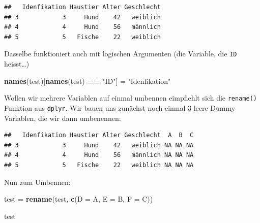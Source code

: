 \documentclass[
]{book}
\newenvironment{Shaded}{\begin{snugshade}}{\end{snugshade}}
\newcommand{\AttributeTok}[1]{\textcolor[rgb]{0.13,0.29,0.53}{#1}}
\newcommand{\ConstantTok}[1]{\textcolor[rgb]{0.56,0.35,0.01}{#1}}
\newcommand{\FunctionTok}[1]{\textcolor[rgb]{0.13,0.29,0.53}{\textbf{#1}}}
\newcommand{\NormalTok}[1]{#1}
\newcommand{\OtherTok}[1]{\textcolor[rgb]{0.56,0.35,0.01}{#1}}
\newcommand{\SpecialCharTok}[1]{\textcolor[rgb]{0.81,0.36,0.00}{\textbf{#1}}}
\newcommand{\StringTok}[1]{\textcolor[rgb]{0.31,0.60,0.02}{#1}}
\begin{document}
\begin{verbatim}
##   Idenfikation Haustier Alter Geschlecht
## 3            3     Hund    42   weiblich
## 4            4     Hund    56   männlich
## 5            5   Fische    22   weiblich
\end{verbatim}

Dasselbe funktioniert auch mit logischen Argumenten (die Variable, die \texttt{ID} heisst\ldots)

\begin{Shaded}
\begin{Highlighting}[]
\FunctionTok{names}\NormalTok{(test)[}\FunctionTok{names}\NormalTok{(test) }\SpecialCharTok{==} \StringTok{"ID"}\NormalTok{] }\OtherTok{=} \StringTok{"Idenfikation"}
\end{Highlighting}
\end{Shaded}

Wollen wir mehrere Variablen auf einmal umbennen eimpfiehlt sich die \texttt{rename()} Funktion aus \texttt{dplyr}. Wir bauen uns zunächst noch einmal 3 leere Dummy Variablen, die wir dann umbenennen:

\begin{Shaded}
\end{Shaded}

\begin{verbatim}
##   Idenfikation Haustier Alter Geschlecht  A  B  C
## 3            3     Hund    42   weiblich NA NA NA
## 4            4     Hund    56   männlich NA NA NA
## 5            5   Fische    22   weiblich NA NA NA
\end{verbatim}

Nun zum Umbennen:

\begin{Shaded}
\begin{Highlighting}[]
\NormalTok{test }\OtherTok{=} \FunctionTok{rename}\NormalTok{(test, }\FunctionTok{c}\NormalTok{(}\AttributeTok{D =}\NormalTok{ A, }
                      \AttributeTok{E =}\NormalTok{ B,}
                      \AttributeTok{F =}\NormalTok{ C))}

\NormalTok{test}
\end{Highlighting}
\end{Shaded}
\end{document}
